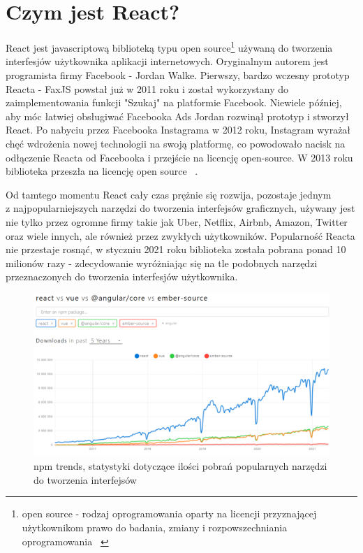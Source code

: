 \documentclass[oneside,polski,logo,indent]{amuthesis}
\begin{document}
\section{Czym jest React?}
{
React jest javascriptową biblioteką typu open source\footnote{open source - rodzaj oprogramowania oparty na licencji przyznającej użytkownikom prawo do badania, zmiany i rozpowszechniania oprogramowania ~\cite{opensourcewiki}} używaną do tworzenia interfesjów użytkownika aplikacji internetowych. Oryginalnym autorem jest programista firmy Facebook - Jordan Walke. Pierwszy, bardzo wczesny prototyp Reacta - FaxJS powstał już w 2011 roku i został wykorzystany do zaimplementowania funkcji "Szukaj" na platformie Facebook. Niewiele później, aby móc łatwiej obsługiwać Facebooka Ads Jordan rozwinął prototyp i stworzył React. Po nabyciu przez Facebooka Instagrama w 2012 roku, Instagram wyrażał chęć wdrożenia nowej technologii na swoją platformę, co powodowało nacisk na odłączenie Reacta od Facebooka i przejście na licencję open-source. W 2013 roku biblioteka przeszła na licencję open source ~\cite{reactstory}. 
\newline

Od tamtego momentu React cały czas prężnie się rozwija, pozostaje jednym \\z najpopularniejszych narzędzi do tworzenia interfejsów graficznych, używany jest nie tylko przez ogromne firmy takie jak Uber, Netflix, Airbnb, Amazon, Twitter oraz wiele innych, ale również przez zwykłych użytkowników. Popularność Reacta nie przestaje rosnąć, w styczniu 2021 roku biblioteka została pobrana ponad 10 milionów razy - zdecydowanie wyróżniając się na tle podobnych narzędzi przeznaczonych do tworzenia interfesjów użytkownika.

\begin{figure}
\centering
\includegraphics[width=14cm]{statystyki react vue angular.png}
\caption{npm trends, statystyki dotyczące ilości pobrań popularnych narzędzi do tworzenia interfejsów}
\label{statystyki react vue angular.png}
\end{figure}

}
\end{document}
